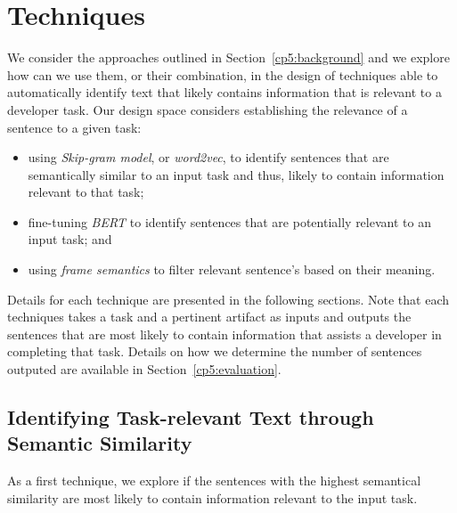 \section{Techniques}
\label{cp5:approaches}







We consider the approaches outlined in Section~\ref{cp5:background} and we explore 
how can we use them, or their combination, in the design of techniques able to automatically identify text that likely contains information that is relevant to a developer task. 
Our design space considers establishing the relevance of a sentence to a given task:

\begin{itemize}
    \item using \textit{Skip-gram model}, or \textit{word2vec}, to identify sentences that are semantically similar to an input task and thus, likely to contain information relevant to that task;
    
    \item fine-tuning \textit{BERT} to identify sentences that are potentially relevant to an input task; and

    \item using \textit{frame semantics} to filter relevant sentence's based on their meaning.
\end{itemize}





Details for each technique are presented in the following sections.
Note that each techniques takes a task and a pertinent artifact as inputs and outputs the sentences 
that are most likely to contain information that assists a developer in completing that task. 
Details on how we determine the number of sentences outputed are available in Section~\ref{cp5:evaluation}.





\subsection{Identifying Task-relevant Text through Semantic Similarity}



As a first technique, we explore if the sentences with the highest semantical similarity are most likely to contain information relevant to the input task.



